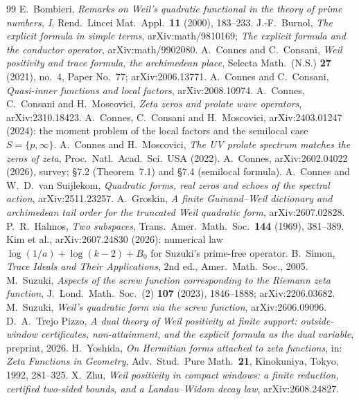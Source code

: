 \documentclass[11pt]{amsart}
\theoremstyle{definition}
\theoremstyle{remark}
\begin{document}
\begin{thebibliography}{99}
 E.~Bombieri, \emph{Remarks on Weil's quadratic functional in the theory of prime numbers, I}, Rend.\ Lincei Mat.\ Appl.\ \textbf{11} (2000), 183--233.
 J.-F.~Burnol, \emph{The explicit formula in simple terms}, arXiv:math/9810169; \emph{The explicit formula and the conductor operator}, arXiv:math/9902080.
 A.~Connes and C.~Consani, \emph{Weil positivity and trace formula, the archimedean place}, Selecta Math.\ (N.S.) \textbf{27} (2021), no.~4, Paper No.~77; arXiv:2006.13771.
 A.~Connes and C.~Consani, \emph{Quasi-inner functions and local factors}, arXiv:2008.10974.
 A.~Connes, C.~Consani and H.~Moscovici, \emph{Zeta zeros and prolate wave operators}, arXiv:2310.18423.
 A.~Connes, C.~Consani and H.~Moscovici, arXiv:2403.01247 (2024): the moment problem of the local factors and the semilocal case $S=\{p,\infty\}$.
 A.~Connes and H.~Moscovici, \emph{The UV prolate spectrum matches the zeros of zeta}, Proc.\ Natl.\ Acad.\ Sci.\ USA (2022).
 A.~Connes, arXiv:2602.04022 (2026), survey; \S7.2 (Theorem~7.1) and \S7.4 (semilocal formula).
 A.~Connes and W.~D.~van Suijlekom, \emph{Quadratic forms, real zeros and echoes of the spectral action}, arXiv:2511.23257.
 A.~Groskin, \emph{A finite Guinand--Weil dictionary and archimedean tail order for the truncated Weil quadratic form}, arXiv:2607.02828.
 P.~R.~Halmos, \emph{Two subspaces}, Trans.\ Amer.\ Math.\ Soc.\ \textbf{144} (1969), 381--389.
 Kim et al., arXiv:2607.24830 (2026): numerical law $\log(1/a)+\log(k-2)+B_0$ for Suzuki's prime-free operator.
 B.~Simon, \emph{Trace Ideals and Their Applications}, 2nd ed., Amer.\ Math.\ Soc., 2005.
 M.~Suzuki, \emph{Aspects of the screw function corresponding to the Riemann zeta function}, J.~Lond.\ Math.\ Soc.\ (2) \textbf{107} (2023), 1846--1888; arXiv:2206.03682.
 M.~Suzuki, \emph{Weil's quadratic form via the screw function}, arXiv:2606.09096.
 D.~A.~Trejo Pizzo, \emph{A dual theory of Weil positivity at finite support: outside-window certificates, non-attainment, and the explicit formula as the dual variable}, preprint, 2026.
 H.~Yoshida, \emph{On Hermitian forms attached to zeta functions}, in: \emph{Zeta Functions in Geometry}, Adv.\ Stud.\ Pure Math.\ \textbf{21}, Kinokuniya, Tokyo, 1992, 281--325.
 X.~Zhu, \emph{Weil positivity in compact windows: a finite reduction, certified two-sided bounds, and a Landau--Widom decay law}, arXiv:2608.24827.
\end{thebibliography}
\end{document}

